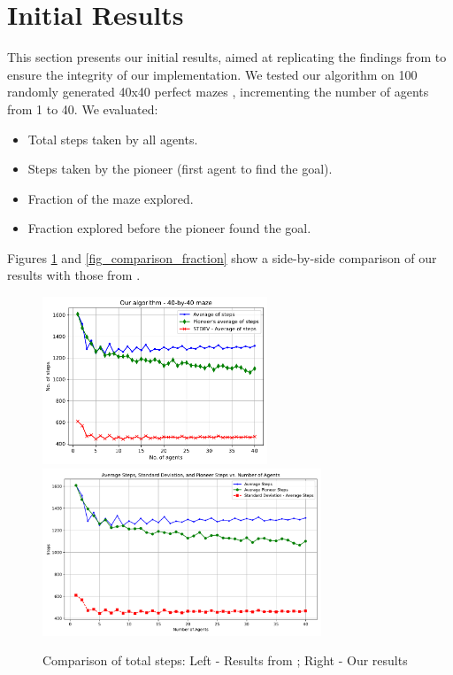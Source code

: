 \section{Initial Results}
\label{section_result_initial_results}

This section presents our initial results,
aimed at replicating the findings from  to ensure the integrity of our implementation.
We tested our algorithm on 100 randomly generated 40x40 perfect mazes \cite{Naeem2021}, incrementing the number of agents from 1 to 40.
We evaluated:

\begin{itemize}
    \item Total steps taken by all agents.
    \item Steps taken by the pioneer (first agent to find the goal).
    \item Fraction of the maze explored.
    \item Fraction explored before the pioneer found the goal.
\end{itemize}

Figures \ref{fig_comparison_steps} and \ref{fig_comparison_fraction} show a side-by-side comparison of our results with those from .

\begin{figure}[H]
\centering
\includegraphics[height=5cm]{Cap3/arthur_40x40_steps.pdf}
\includegraphics[height=5cm]{Cap3/self_steps_40x40.pdf}
\caption{Comparison of total steps: Left - Results from ; Right - Our results}
\label{fig_comparison_steps}
\end{figure}

